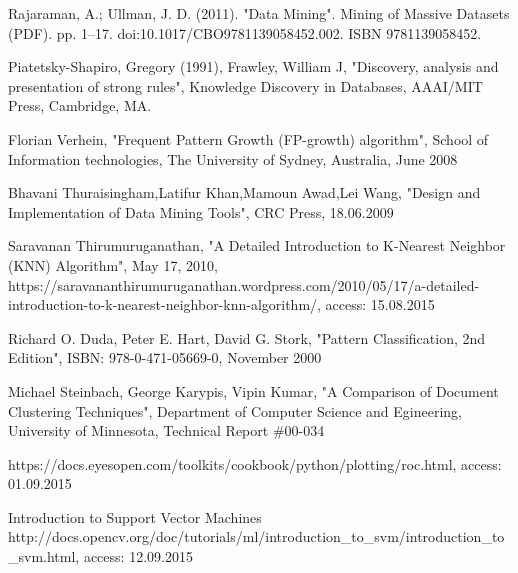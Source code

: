 \begin{thebibliography}{99}
Rajaraman, A.; Ullman, J. D. (2011). "Data Mining". Mining of Massive Datasets (PDF). pp. 1–17. doi:10.1017/CBO9781139058452.002. ISBN 9781139058452.

Piatetsky-Shapiro, Gregory (1991), Frawley, William J, "Discovery, analysis and presentation of strong rules", Knowledge Discovery in Databases, AAAI/MIT Press, Cambridge, MA.

Florian Verhein, "Frequent Pattern Growth (FP-growth) algorithm", School of Information technologies, The University of Sydney, Australia, June 2008

Bhavani Thuraisingham,Latifur Khan,Mamoun Awad,Lei Wang, "Design and Implementation of Data Mining Tools", CRC Press, 18.06.2009

Saravanan Thirumuruganathan, "A Detailed Introduction to K-Nearest Neighbor (KNN) Algorithm", May 17, 2010, https://saravananthirumuruganathan.wordpress.com/2010/05/17/a-detailed-introduction-to-k-nearest-neighbor-knn-algorithm/, access: 15.08.2015

Richard O. Duda, Peter E. Hart, David G. Stork, "Pattern Classification, 2nd Edition", ISBN: 978-0-471-05669-0, November 2000

Michael Steinbach, George Karypis, Vipin Kumar, "A Comparison of Document Clustering Techniques", Department of Computer Science and Egineering,  University of Minnesota, Technical Report \#00-034 

https://docs.eyesopen.com/toolkits/cookbook/python/plotting/roc.html, access: 01.09.2015

Introduction to Support Vector Machines http://docs.opencv.org/doc/tutorials/ml/introduction\_to\_svm/introduction\_to\_svm.html, access: 12.09.2015

\end{thebibliography}